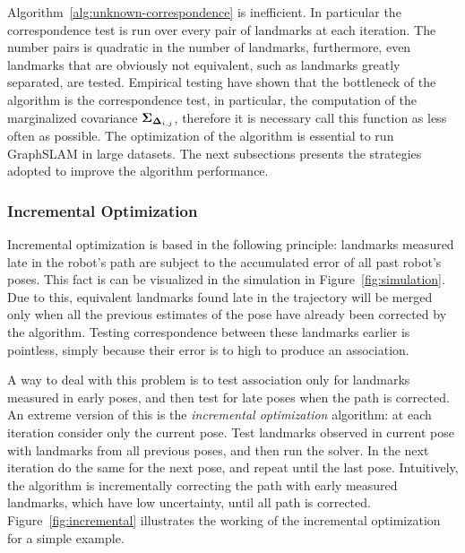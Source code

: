 Algorithm~\ref{alg:unknown-correspondence} is inefficient. In particular the correspondence test is run over every pair of landmarks at each iteration. The number pairs is quadratic in the number of landmarks, furthermore, even landmarks that are obviously not equivalent, such as landmarks greatly separated, are tested. Empirical testing have shown that the bottleneck of the algorithm is the correspondence test, in particular, the computation of the marginalized covariance $\boldsymbol{\Sigma}_{\boldsymbol{\Delta}_{i,j}}$, therefore it is necessary call this function as less often as possible. The optimization of the algorithm is essential to run GraphSLAM in large datasets. The next subsections presents the strategies adopted to improve the algorithm performance.

\subsubsection{Incremental Optimization}

Incremental optimization is based in the following principle: landmarks measured late in the robot's path are subject to the accumulated error of all past robot's poses. This fact is can be visualized in the simulation in Figure~\ref{fig:simulation}. Due to this, equivalent landmarks found late in the trajectory will be merged only when all the previous estimates of the pose have already been corrected by the algorithm. Testing correspondence between these landmarks earlier is pointless, simply because their error is to high to produce an association. 

A way to deal with this problem is to test association only for landmarks measured in early poses, and then test for late poses when the path is corrected. An extreme version of this is the \emph{incremental optimization} algorithm: at each iteration consider only the current pose. Test landmarks observed in current pose with landmarks from all previous poses, and then run the solver. In the next iteration do the same for the next pose, and repeat until the last pose. Intuitively, the algorithm is incrementally correcting the path with early measured landmarks, which have low uncertainty, until all path is corrected. Figure~\ref{fig:incremental} illustrates the working of the incremental optimization for a simple example.

